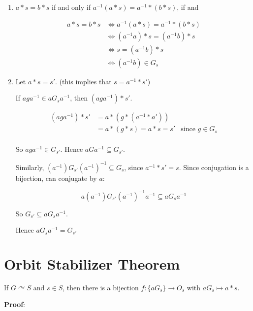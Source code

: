 \documentclass[12pt]{article}
\def\acts{\curvearrowright}
\begin{document}
\begin{enumerate}
  \item $a * s = b * s$ if and only if $a^{-1} (a * s) = a^{-1} * (b * s)$, if
    and

    \begin{align*}
      a * s = b * s &\Leftrightarrow a^{-1} (a * s) = a^{-1} * (b * s) \\
                    &\Leftrightarrow (a^{-1} a) * s = (a^{-1} b) * s \\
                    &\Leftrightarrow s = (a^{-1} b) * s \\
                    &\Leftrightarrow (a^{-1} b) \in G_s
    \end{align*}

  \item Let $a * s = s'$. (this implies that $s = a^{-1} * s'$)

    If $aga^{-1} \in a G_s a^{-1}$, then $(aga^{-1}) * s'$.

    \begin{align*}
      (aga^{-1}) * s' &= a * (g * (a^{-1} * a')) \\
                      &= a * (g * s) = a * s = s' &\text{since $g \in G_s$} \\
    \end{align*}

    So $aga^{-1} \in G_{s'}$. Hence $a G a^{-1} \subseteq G_{s'}$.

    Similarly, $(a^{-1}) G_{s'}(a^{-1})^{-1} \subseteq G_s$, since $a^{-1} *  s'
    = s$. Since conjugation is a bijection, can conjugate by $a$:

    \[
      a(a^{-1}) G_{s'}(a^{-1})^{-1}a^{-1} \subseteq a G_s a^{-1}
    \]

    So $G_{s'} \subseteq a G_s a^{-1}$.

    Hence $a G_s a^{-1} = G_{s'}$
\end{enumerate}

\section {Orbit Stabilizer Theorem}

If $G \acts S$ and $s \in S$, then there is a bijection $f: \{aG_s\} \to O_s$
with $aG_s \mapsto a * s$.

{\bf Proof}:
\end{document}
